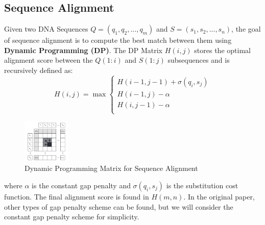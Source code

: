 \documentclass{article}
\begin{document}
\subsection*{Sequence Alignment}
Given two DNA Sequences $Q = (q_1,q_2,...,q_m)$ and $S = (s_1,s_2,...,s_n)$, the goal of sequence alignment is to compute the best match between them using \textbf{Dynamic Programming (DP)}. The DP Matrix $H(i,j)$ stores the optimal alignment score between the $Q(1:i)$ and $S(1:j)$ subsequences and is recursively defined as: 
\begin{equation}
H(i,j) = \max{\begin{cases}
  H(i-1,j-1) + \sigma(q_i,s_j) \\
  H(i-1,j) - \alpha \\
  H(i,j-1) - \alpha \\
\end{cases}}
\end{equation}

\begin{figure}
    \centering
    \includegraphics[width=0.2\textwidth]{dpmatrix.png}
    \caption{Dynamic Programming Matrix for Sequence Alignment}
    \label{fig:dp_matrix}
\end{figure}

where $\alpha$ is the constant gap penalty and $\sigma(q_i,s_j)$ is the substitution cost function. The final alignment score is found in $H(m,n)$. In the original paper, other types of gap penalty scheme can be found, but we will consider the constant gap penalty scheme for simplicity.

\end{document}

